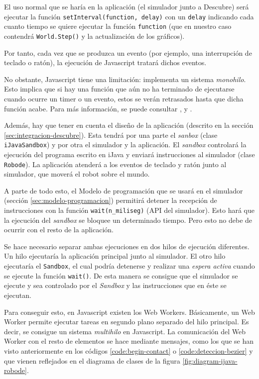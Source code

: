 El uso normal que se haría en la aplicación (el simulador junto a Descubre) será ejecutar la función \texttt{setInterval(function, delay)} con un \texttt{delay} indicando cada cuanto tiempo se quiere ejecutar la función \texttt{function} (que en nuestro caso contendrá \texttt{World.Step()} y la actualización de los gráficos).

Por tanto, cada vez que se produzca un evento (por ejemplo, una interrupción de teclado o ratón), la ejecución de Javascript tratará dichos eventos. 

No obstante, Javascript tiene una limitación: implementa un sistema \emph{monohilo}. Esto implica que si hay una función que aún no ha terminado de ejecutarse cuando ocurre un timer o un evento, estos se verán retrasados hasta que dicha función acabe. Para más información, se puede consultar \cite{js-timers-works}, \cite{event-loop-js} y \cite{resig2013secrets}.

Además, hay que tener en cuenta el diseño de la aplicación (descrito en la sección \ref{sec:integracion-descubre}). Esta tendrá por una parte el \emph{sanbox} (clase \texttt{iJavaSandbox}) y por otra el simulador y la aplicación. El \emph{sandbox}  controlará la ejecución del programa escrito en iJava y enviará instrucciones al simulador (clase \texttt{Robode}). La aplicación atenderá a los eventos de teclado y ratón junto al simulador, que moverá el robot sobre el mundo.

A parte de todo esto, el Modelo de programación que se usará en el simulador (sección \ref{sec:modelo-programacion}) permitirá detener la recepción de instrucciones con la función \texttt{wait(n\_miliseg)} (API del simulador). Esto hará que la ejecución del \emph{sandbox} se bloquee un determinado tiempo. Pero esto no debe de ocurrir con el resto de la aplicación.


Se hace necesario separar ambas ejecuciones en dos hilos de ejecución diferentes. Un hilo ejecutaría la aplicación principal junto al simulador. El otro hilo ejecutaría el \texttt{Sandbox}, el cual podría detenerse y realizar una \emph{espera activa} cuando se ejecute la función \texttt{wait()}. De esta manera se consigue que el simulador se ejecute y sea controlado por el \emph{Sandbox} y las instrucciones que en éste se ejecutan.

Para conseguir esto, en Javascript existen los Web Workers\cite{web-worker-mdn}. Básicamente, un Web Worker permite ejecutar tareas en segundo plano separado del hilo principal. Es decir, se consigue un sistema \emph{multihilo} en Javascript. La comunicación del Web Worker con el resto de elementos se hace mediante mensajes, como los que se han visto anteriormente en los códigos \ref{code:begin-contact} o \ref{code:deteccion-bezier} y que vienen reflejados en el diagrama de clases de la figura \ref{fig:diagram-ijava-robode}.

